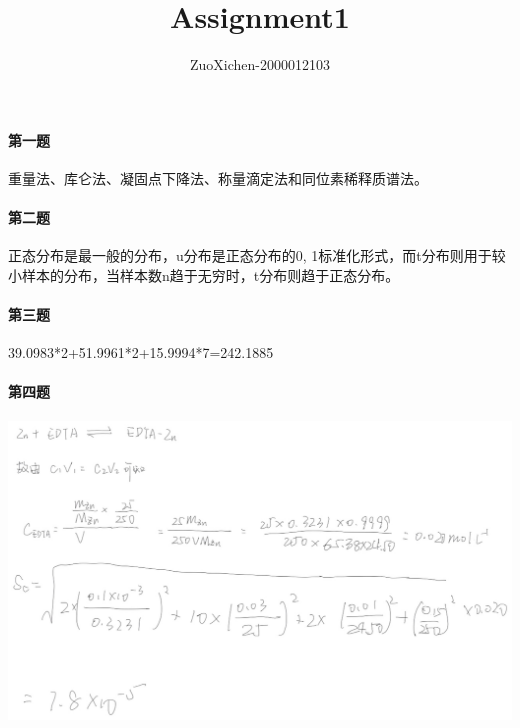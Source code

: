 \documentclass[utf8]{ctexart}
\title{Assignment1}
\author{ZuoXichen-2000012103}
\begin{document}
    \maketitle
    \paragraph*{第一题}重量法、库仑法、凝固点下降法、称量滴定法和同位素稀释质谱法。
    \paragraph*{第二题}正态分布是最一般的分布，u分布是正态分布的0, 1标准化形式，而t分布则用于较小样本的分布，当样本数n趋于无穷时，t分布则趋于正态分布。
    \paragraph*{第三题}39.0983*2+51.9961*2+15.9994*7=242.1885
    \paragraph*{第四题}
    \includegraphics[scale=0.3]{lib/assign1-1.jpg}
\end{document}
